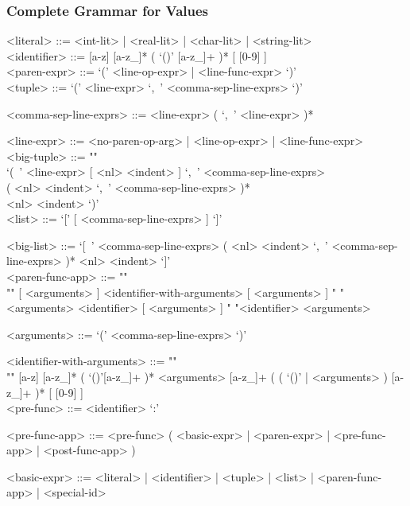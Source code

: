 \documentclass{article}
\begin{document}
\subsubsection{Complete Grammar for Values}
\begin{grammar}

<literal> ::= <int-lit> | <real-lit> | <char-lit> | <string-lit>
\\

<identifier> ::= [a-z] [a-z_]* ( `()' [a-z_]+ )* [ [0-9] ]
\\

<paren-expr> ::= `(' <line-op-expr> | <line-func-expr> `)'  
\\

<tuple> ::= `(' <line-expr> `,\ ' <comma-sep-line-exprs> `)'

<comma-sep-line-exprs> ::= <line-expr> ( `,\ ' <line-expr> )*

<line-expr> ::= <no-paren-op-arg> | <line-op-expr> | <line-func-expr>
\\

<big-tuple> ::= ""\\
`(\ ' <line-expr> [ <nl> <indent> ] `,\ ' <comma-sep-line-exprs> \\
( <nl> <indent> `,\ ' <comma-sep-line-exprs> )* \\
<nl> <indent> `)'
\\

<list> ::= `[' [ <comma-sep-line-exprs> ] `]'

<big-list> ::= 
`[\ ' <comma-sep-line-exprs>
( <nl> <indent> `,\ ' <comma-sep-line-exprs> )*
<nl> <indent> `]'
\\

<paren-func-app> ::= ""\\""
[ <arguments> ] <identifier-with-arguments> [ <arguments> ]
\alt " "<arguments> <identifier> [ <arguments> ]
\alt " "<identifier> <arguments>

<arguments> ::= `(' <comma-sep-line-exprs> `)'

<identifier-with-arguments> ::= ""\\""
[a-z] [a-z_]* ( `()'[a-z_]+ )* <arguments>
[a-z_]+ ( ( `()' | <arguments> ) [a-z_]+ )* 
[ [0-9] ]
\\

<pre-func> ::= <identifier> `:'

<pre-func-app> ::=
<pre-func> ( <basic-expr> | <paren-expr> | <pre-func-app> | <post-func-app> )

<basic-expr> ::=
<literal> | <identifier> | <tuple> | <list> | <paren-func-app> | <special-id>
\\


\end{grammar}
\end{document}
